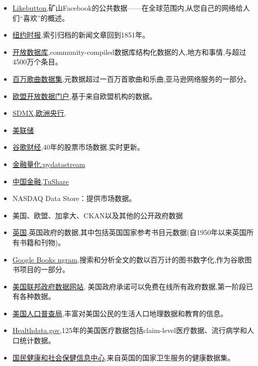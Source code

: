 \documentclass[letterpaper,10pt,english]{sphinxmanual}
\begin{document}
\begin{itemize}
\item {} 
\href{http://likebutton.com/}{Likebutton},矿山Facebook的公共数据——在全球范围内,从您自己的网络给人们“喜欢”的概述。

\item {} 
\href{http://developer.nytimes.com/docs}{纽约时报},索引归档的新闻文章回到1851年。

\item {} 
\href{http://www.freebase.com}{开放数据库},community-compiled数据库结构化数据的人,地方和事情,与超过4500万个条目。

\item {} 
\href{http://aws.amazon.com/datasets/6468931156960467}{百万歌曲数据集},元数据超过一百万首歌曲和乐曲,亚马逊网络服务的一部分。

\item {} 
\href{http://open-data.europa.eu/en/data/}{欧盟开放数据门户},基于来自欧盟机构的数据。

\item {} 
\href{https://sdmx.org/}{SDMX,欧洲央行},

\item {} 
\href{https://research.stlouisfed.org/fred2}{美联储}

\item {} 
\href{https://www.google.com/finance}{谷歌财经},40年的股票市场数据,实时更新。

\item {} 
\href{http://dataworks.thomson.com/Dataworks/Enterprise/1.0/}{金融量化:pydatastream}

\item {} 
\href{http://waditu.com/index.html}{中国金融,TuShare}

\item {} 
NASDAQ Data Store：提供市场数据。

\item {} 
美国、欧盟、加拿大、CKAN以及其他的公开政府数据

\item {} 
\href{http://data.gov.uk/}{英国},英国政府的数据,其中包括英国国家参考书目元数据(自1950年以来英国所有书籍和刊物)。

\item {} 
\href{http://storage.googleapis.com/books/ngrams/books/datasetsv2.html}{Google Books ngram},搜索和分析全文的数以百万计的图书数字化,作为谷歌图书项目的一部分。

\item {} 
\href{http://data.gov}{美国联邦政府数据网站}, 美国政府承诺可以免费在线所有政府数据,第一阶段已有各种数据。

\item {} 
\href{http://www.census.gov/data.html}{美国人口普查局},丰富对美国公民的生活人口地理数据和教育的信息。

\item {} 
\href{https://www.healthdata.gov}{Healthdata.gov},125年的美国医疗数据包括claim-level医疗数据、流行病学和人口统计数据。

\item {} 
\href{http://www.hscic.gov.uk/home}{国民健康和社会保健信息中心},来自英国的国家卫生服务的健康数据集。

\end{itemize}
\end{document}
